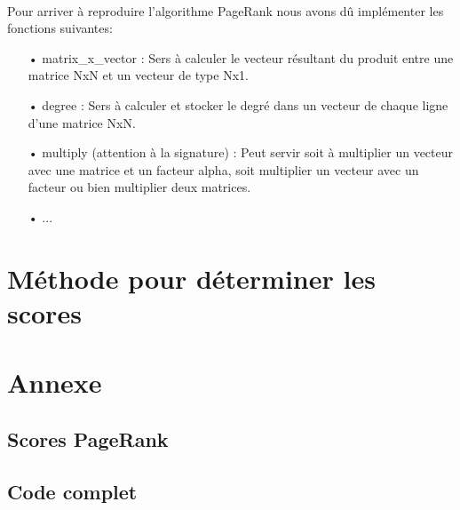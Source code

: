 \documentclass[10pt,a4paper]{article}
\begin{document}
\paragraph{}Pour arriver à reproduire l'algorithme PageRank nous avons dû implémenter les fonctions suivantes:

\hspace{1.5cm}

\begin{itemize}
    \item[•] matrix\_x\_vector : Sers à calculer le vecteur résultant du produit entre une matrice NxN et un vecteur de type Nx1.
    \item[•] degree : Sers à calculer et stocker le degré dans un vecteur de chaque ligne d'une matrice NxN.
    \item[•] multiply (attention à la signature) : Peut servir soit à multiplier un vecteur avec une matrice et un facteur alpha, soit multiplier un vecteur avec un facteur ou bien multiplier deux matrices.
    \item[•] ...
\end{itemize}

\section{Méthode pour déterminer les scores}


\section{Annexe}

\subsection{Scores PageRank}


\subsection{Code complet}
\end{document}

